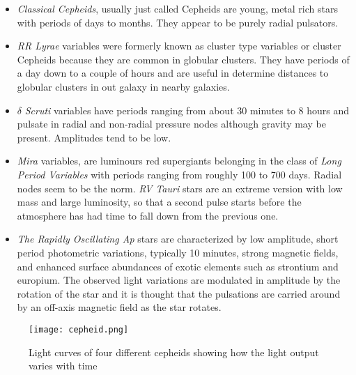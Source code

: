 \begin{itemize}
    \item \textit{Classical Cepheids}, usually just called Cepheids are young, metal rich stars with periods of days to months. They appear to be purely radial pulsators.
    \item \textit{RR Lyrae} variables were formerly known as cluster type variables or cluster Cepheids because they are common in globular clusters. They have periods of a day down to a couple of hours and are useful in determine distances to globular clusters in out galaxy in nearby galaxies.
    \item $\delta$ \textit{Scruti} variables have periods ranging from about 30 minutes to 8 hours and pulsate in radial and non-radial pressure nodes although gravity may be present. Amplitudes tend to be low.
    \item \textit{Mira} variables, are luminours red supergiants belonging in the class of \textit{Long Period Variables} with periods ranging from roughly 100 to 700 days. Radial nodes seem to be the norm.  \textit{RV Tauri} stars are an extreme version with low mass and large luminosity, so that a second pulse starts before the atmosphere has had time to fall down from the previous one.
    \item \textit{The Rapidly Oscillating Ap} stars are characterized by low amplitude, short period photometric variations, typically 10 minutes, strong magnetic fields, and enhanced surface abundances of exotic elements such as strontium and europium. The observed light variations are modulated in amplitude by the rotation of the star and it is thought that the pulsations are carried around by an off-axis magnetic field as the star rotates.
\end{itemize}
\begin{figure}[H]
    \centering
    \color{white}
    \texttt{[image: cepheid.png]}
    \caption{Light curves of four different cepheids showing how the light output varies with time}
    \label{fig:my_label}
\end{figure}
\noindent
